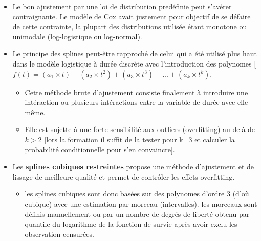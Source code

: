 \documentclass[
  12pt,
  letterpaper,
  DIV=11,
  numbers=noendperiod,
  onepage,
  openany]{scrreprt}
\providecommand{\tightlist}{%
  \setlength{\itemsep}{0pt}\setlength{\parskip}{0pt}}\usepackage{longtable,booktabs,array}
\begin{document}
\begin{itemize}
\tightlist
\item
  Le bon ajustement par une loi de distribution predéfinie peut s'avérer
  contraignante. Le modèle de Cox avait justement pour objectif de se
  défaire de cette contrainte, la plupart des distributions utilisée
  étant monotone ou unimodale (log-logistique ou log-normal).
\item
  Le principe des splines peut-être rapproché de celui qui a été utilisé
  plus haut dans le modèle logistique à durée discrète avec
  l'introduction des polynomes {[}
  \(f(t)= (a_1\times t) + (a_2\times t^2) + (a_3\times t^3) + ...+ (a_k\times t^k)\).

  \begin{itemize}
  \tightlist
  \item
    Cette méthode brute d'ajustement consiste finalement à introduire
    une intéraction ou plusieurs intéractions entre la variable de durée
    avec elle-même.
  \item
    Elle est sujette à une forte sensibilité aux outliers (overfitting)
    au delà de \(k>2\) {[}lors la formation il suffit de la tester pour
    k=3 et calculer la probabilité conditionnelle pour s'en
    convaincre{]}.
  \end{itemize}
\item
  Les \textbf{splines cubiques restreintes} propose une méthode
  d'ajustement et de lissage de meilleure qualité et permet de contrôler
  les effets overfitting.

  \begin{itemize}
  \tightlist
  \item
    les splines cubiques sont donc basées sur des polynomes d'ordre 3
    (d'où cubique) avec une estimation par morceau (intervalles). les
    morceaux sont définis manuellement ou par un nombre de degrés de
    liberté obtenu par quantile du logarithme de la fonction de survie
    après avoir exclu les observation censurées.


\end{itemize}
\end{itemize}
\end{document}
